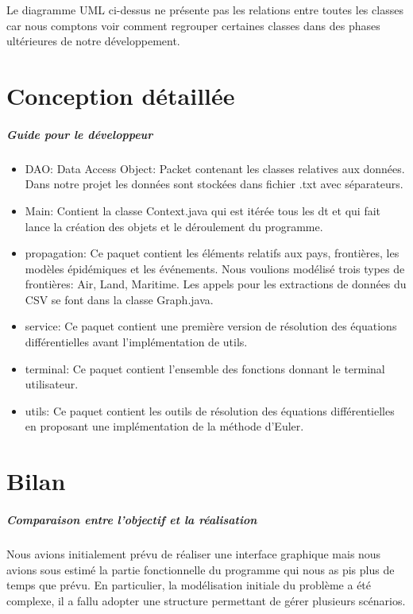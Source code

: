 \documentclass[12pt,a4paper]{report}
\begin{document}
\begin{flushleft}
	Le diagramme UML ci-dessus ne présente pas les relations entre toutes les classes car nous comptons voir comment regrouper certaines classes dans des phases ultérieures de notre développement.
\end{flushleft}


\chapter*{Conception détaillée}
\paragraph{Guide pour le développeur}

\begin{flushleft}
\begin{itemize}
L'aborescence des paquets est la suivante:
\item DAO: Data Access Object: Packet contenant les classes relatives aux données. Dans notre projet les données sont stockées dans fichier .txt avec séparateurs.
\item Main: Contient la classe Context.java qui est itérée tous les dt et qui fait lance la création des objets et le déroulement du programme.
\item propagation: Ce paquet contient les éléments relatifs aux pays, frontières, les modèles épidémiques et les événements. Nous voulions modélisé trois types de frontières: Air, Land, Maritime. Les appels pour les extractions de données du CSV se font dans la classe Graph.java.
\item service: Ce paquet contient une première version de résolution des équations différentielles avant l'implémentation de utils.
\item terminal: Ce paquet contient l'ensemble des fonctions donnant le terminal utilisateur.
\item utils: Ce paquet contient les outils de résolution des équations différentielles en proposant une implémentation de la méthode d'Euler.
\end{itemize}
\end{flushleft}

\chapter*{Bilan}

\paragraph{Comparaison entre l'objectif et la réalisation}
\begin{flushleft}
Nous avions initialement prévu de réaliser une interface graphique mais nous avions sous estimé la partie fonctionnelle du programme qui nous as pis plus de temps que prévu.
En particulier, la modélisation initiale du problème a été complexe, il a fallu adopter une structure permettant de gérer plusieurs scénarios.
\end{flushleft}
\end{document}
